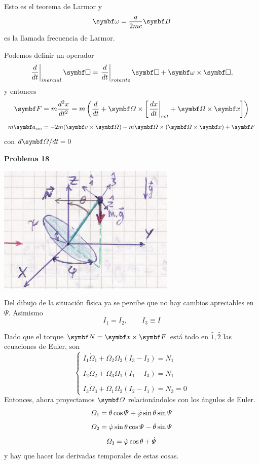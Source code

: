 \documentclass[10pt,oneside]{CBFT_book}
\begin{document}
Esto es el teorema de Larmor y 
\[
	\vb{\omega} = \frac{q}{2 m c} \vb{B}
\]
es la llamada frecuencia de Larmor.

Podemos definir un operador 
\[
	\left.\dtot{}{t}\right|_{inercial} \vb{\Box} =  \left.\dtot{}{t}\right|_{rotante} \vb{\Box}
	+ \vb{\omega } \times \vb{ \Box },
\]
y entonces
\[
	\vb{F} = m \dtot[2]{x}{t} = m \left( \dtot{}{t} + \vb{\Omega} \times 
	\left[ \left.\dtot{x}{t}\right|_{rot} + \vb{\Omega} \times \vb{x} \right] \right)
\]
\[
	m \vb{a}_{cm} = - 2 m ( \vb{v}\times\vb{\Omega}) - m \vb{\Omega} \times (\vb{\Omega}\times\vb{x}) + \vb{F}
\]
con $d\vb{\Omega}/dt = 0$


\begin{ejemplo}{\bf Problema 18}

\includegraphics[scale=0.4]{images/fig_mc_problema_18.jpg}

Del dibujo de la situación física ya se percibe que no hay cambios apreciables en $\Psi$. Asimismo
\[
	I_1 = I_2, \qquad  I_3 \equiv I
\]

Dado que el torque $\vb{N} = \vb{x} \times \vb{F}$ está todo en $\hat{1}, \hat{2}$ las ecuaciones de Euler, son
\[
	\begin{cases}
	I_1 \dot{\Omega}_1 + \Omega_2 \Omega_3 (I_3 - I_2 ) = N_1 \\
	\\
	I_2 \dot{\Omega}_2 + \Omega_3 \Omega_1 (I_1 - I_3 ) = N_1 \\
	\\
	I_3 \dot{\Omega}_3 + \Omega_1 \Omega_2 (I_2 - I_1 ) = N_3 = 0 
	\end{cases}
\]
Entonces, ahora proyectamos $\vb{\Omega}$ relacionándolos con los ángulos de Euler.
\[
	\Omega_1 = \dot{\theta} \cos \Psi + \dot{\varphi} \sin \theta \sin \Psi
\]
\[
	\Omega_2 = \dot{\varphi} \sin \theta \cos \Psi - \dot{\theta}\sin\Psi
\]
\[
	\Omega_3 = \dot{\varphi} \cos\theta + \dot{\Psi}
\]
y hay que hacer las derivadas temporales de estas cosas.


\end{ejemplo}
\end{document}
